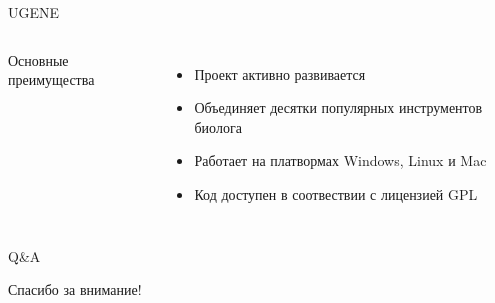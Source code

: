 \documentclass[utf8, professionalfont]{beamer}
\begin{document}
\begin{frame}{UGENE}

\begin{columns}[c]
	Основные преимущества
	\begin{itemize}
		\item Проект активно развивается
		\item Объединяет десятки популярных инструментов биолога
		\item Работает на платвормах Windows, Linux и Mac
		\item Код доступен в соотвествии с лицензией GPL
	\end{itemize}
	
	
\end{columns}

\end{frame}

\begin{frame}{Q\&A}
\begin{center} 
\LARGE{Спасибо за внимание!}
\end{center}
\end{frame}
\end{document}

